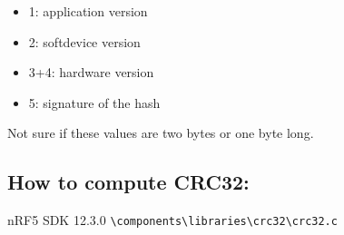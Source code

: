 \begin{itemize}
\tightlist
\item
  1: application version
\item
  2: softdevice version
\item
  3+4: hardware version
\item
  5: signature of the hash
\end{itemize}

Not sure if these values are two bytes or one byte long.

\hypertarget{how-to-compute-crc32}{%
\subsection{How to compute CRC32:}\label{how-to-compute-crc32}}

nRF5 SDK 12.3.0
\texttt{\textbackslash{}components\textbackslash{}libraries\textbackslash{}crc32\textbackslash{}crc32.c}
